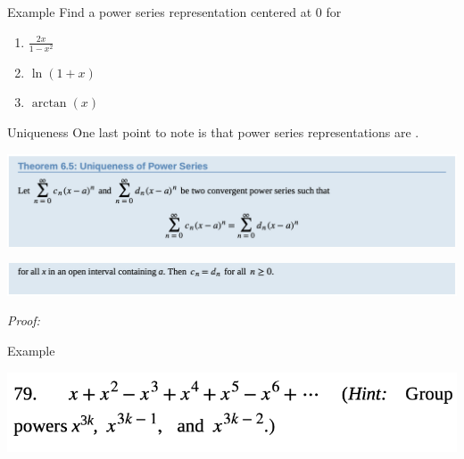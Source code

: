 \documentclass[presentation]{beamer}
\begin{document}
\begin{frame}[label={sec:orga0639e1}]{Example}
Find a power series representation centered at 0 for

\begin{enumerate}
\item \(\frac{2x}{1-x^2}\)

\item \(\ln(1+x)\)

\item \(\arctan(x)\)
\vspace{10in}
\end{enumerate}
\end{frame}

\begin{frame}[label={sec:org4162815}]{Uniqueness}
One last point to note is that power series representations
are \uline{\hspace*{1in}}.

\begin{center}
\begin{center}
\includegraphics[width=.9\linewidth]{../img/unique1.png}
\end{center}

\begin{center}
\includegraphics[width=.9\linewidth]{../img/unique2.png}
\end{center}
\end{center}

\emph{Proof:}
\vspace{10in}
\end{frame}

\begin{frame}[label={sec:org06c6229}]{Example}
\begin{center}
\includegraphics[width=.9\linewidth]{../img/prob1.png}
\end{center}

\vspace{10in}
\end{frame}
\end{document}

